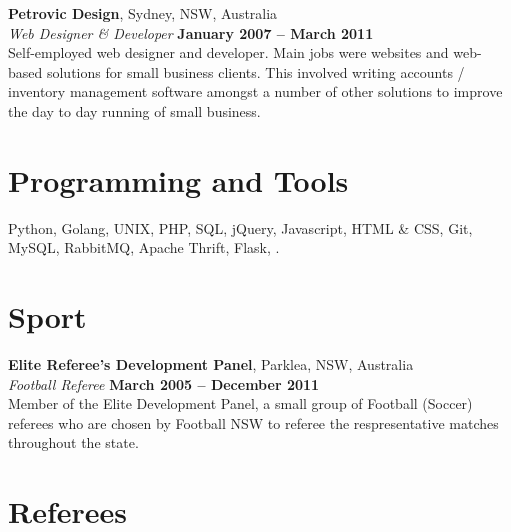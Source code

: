 \documentclass[margin,line]{resume}
\begin{document}
\begin{resume}
    \textbf{Petrovic Design}, Sydney, NSW, Australia \vspace{2mm}\\\vspace{1mm}%
    \textsl{Web Designer \& Developer} \hfill \textbf{January 2007 -- March 2011}\\
    Self-employed web designer and developer. Main jobs were websites and web-based solutions for small business clients.
    This involved writing accounts / inventory management software amongst a number of other solutions to improve the day
    to day running of small business.

    \section{\mysidestyle Programming and Tools} 

    Python, Golang, UNIX, PHP, SQL, jQuery, Javascript, HTML \& CSS, Git, MySQL, RabbitMQ, Apache Thrift, Flask, \LaTeXe.



\vspace{5mm}
\section{\mysidestyle Sport}
	
	\textbf{Elite Referee's Development Panel}, Parklea, NSW, Australia \vspace{2mm}\\\vspace{1mm}%
	\textsl{Football Referee} \hfill \textbf{March 2005 -- December 2011}\\
	Member of the Elite Development Panel, a small group of Football (Soccer) referees who are chosen by Football NSW
	to referee the respresentative matches throughout the state.


\section{\mysidestyle Referees} 


\end{resume}
\end{document}
